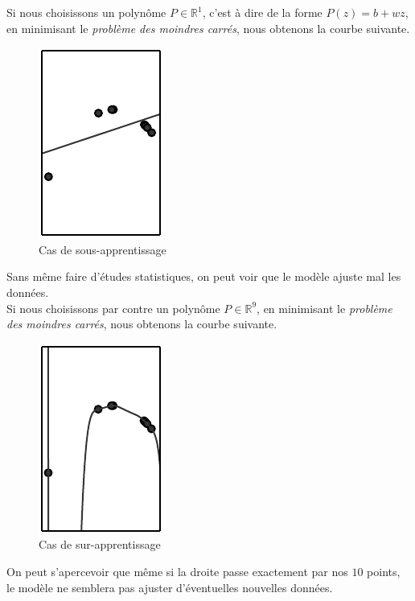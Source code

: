 \documentclass[10pt,a4paper]{report}
\begin{document}
			
			Si nous choisissons un polynôme $P \in \mathbb{R}^1$, c'est à dire de la forme $P(z) = b + wz$, en minimisant le \emph{problème des moindres carrés}, nous obtenons la courbe suivante.
			\begin{figure}[H]
				\begin{center}
					\includegraphics[scale=0.5]{Images/underfitting.png}
					\caption{Cas de sous-apprentissage}			
				\end{center}
			\end{figure}
			Sans même faire d'études statistiques, on peut voir que le modèle ajuste mal les données.\\
			Si nous choisissons par contre un polynôme $P \in \mathbb{R}^9$, en minimisant le \emph{problème des moindres carrés}, nous obtenons la courbe suivante.
			\begin{figure}[H]
				\begin{center}
					\includegraphics[scale=0.5]{Images/overfitting.png}
					\caption{Cas de sur-apprentissage}
				\end{center}
			\end{figure}
			On peut s'apercevoir que même si la droite passe exactement par nos $10$ points, le modèle ne semblera pas ajuster d'éventuelles nouvelles données.
			
\end{document}
